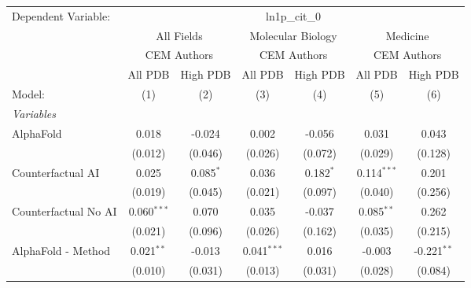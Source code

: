 \begingroup
\centering
\begin{tabular}{lcccccc}
   \tabularnewline \midrule \midrule
   Dependent Variable: & \multicolumn{6}{c}{ln1p\_cit\_0}\\
 & \multicolumn{2}{c}{All Fields} & \multicolumn{2}{c}{Molecular Biology} & \multicolumn{2}{c}{Medicine} \\
\cmidrule(lr){2-3} \cmidrule(lr){4-5} \cmidrule(lr){6-7}
 & \multicolumn{2}{c}{CEM Authors} & \multicolumn{2}{c}{CEM Authors} & \multicolumn{2}{c}{CEM Authors} \\
\cmidrule(lr){2-3} \cmidrule(lr){4-5} \cmidrule(lr){6-7}
 & \multicolumn{1}{c}{All PDB} & \multicolumn{1}{c}{High PDB} & \multicolumn{1}{c}{All PDB} & \multicolumn{1}{c}{High PDB} & \multicolumn{1}{c}{All PDB} & \multicolumn{1}{c}{High PDB} \\
\cmidrule(lr){2-2} \cmidrule(lr){3-3} \cmidrule(lr){4-4} \cmidrule(lr){5-5} \cmidrule(lr){6-6} \cmidrule(lr){7-7}
   Model:                                                     & (1)            & (2)         & (3)           & (4)         & (5)           & (6)\\  
   \midrule
   \emph{Variables}\\
   AlphaFold                                                  & 0.018          & -0.024      & 0.002         & -0.056      & 0.031         & 0.043\\   
                                                              & (0.012)        & (0.046)     & (0.026)       & (0.072)     & (0.029)       & (0.128)\\   
   Counterfactual AI                                          & 0.025          & 0.085$^{*}$ & 0.036         & 0.182$^{*}$ & 0.114$^{***}$ & 0.201\\   
                                                              & (0.019)        & (0.045)     & (0.021)       & (0.097)     & (0.040)       & (0.256)\\   
   Counterfactual No AI                                       & 0.060$^{***}$  & 0.070       & 0.035         & -0.037      & 0.085$^{**}$  & 0.262\\   
                                                              & (0.021)        & (0.096)     & (0.026)       & (0.162)     & (0.035)       & (0.215)\\   
   AlphaFold - Method                                         & 0.021$^{**}$   & -0.013      & 0.041$^{***}$ & 0.016       & -0.003        & -0.221$^{**}$\\   
                                                              & (0.010)        & (0.031)     & (0.013)       & (0.031)     & (0.028)       & (0.084)\\   

\end{tabular}
